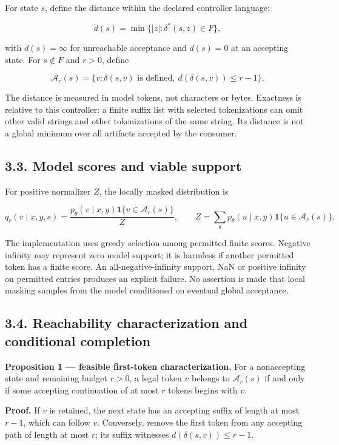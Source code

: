\documentclass[
  12pt,
  a4paper,
]{article}
\begin{document}
For state \(s\), define the distance within the declared controller
language:

\[d(s)=\min\{|z|:\delta^*(s,z)\in F\},\]

with \(d(s)=\infty\) for unreachable acceptance and \(d(s)=0\) at an
accepting state. For \(s\notin F\) and \(r>0\), define

\[\mathcal A_r(s)=\{v:\delta(s,v)\text{ is defined},\ d(\delta(s,v))\le r-1\}.\]

The distance is measured in model tokens, not characters or bytes.
Exactness is relative to this controller: a finite suffix list with
selected tokenizations can omit other valid strings and other
tokenizations of the same string. Its distance is not a global minimum
over all artifacts accepted by the consumer.

\subsection{3.3. Model scores and viable
support}\label{model-scores-and-viable-support}

For positive normalizer \(Z\), the locally masked distribution is

\[q_r(v\mid x,y,s)=\frac{p_\theta(v\mid x,y)\mathbf 1\{v\in\mathcal A_r(s)\}}{Z},\qquad Z=\sum_u p_\theta(u\mid x,y)\mathbf 1\{u\in\mathcal A_r(s)\}.\]

The implementation uses greedy selection among permitted finite scores.
Negative infinity may represent zero model support; it is harmless if
another permitted token has a finite score. An all-negative-infinity
support, NaN or positive infinity on permitted entries produces an
explicit failure. No assertion is made that local masking samples from
the model conditioned on eventual global acceptance.

\subsection{3.4. Reachability characterization and conditional
completion}\label{reachability-characterization-and-conditional-completion}

\textbf{Proposition 1 --- feasible first-token characterization.} For a
nonaccepting state and remaining budget \(r>0\), a legal token \(v\)
belongs to \(\mathcal A_r(s)\) if and only if some accepting
continuation of at most \(r\) tokens begins with \(v\).

\textbf{Proof.} If \(v\) is retained, the next state has an accepting
suffix of length at most \(r-1\), which can follow \(v\). Conversely,
remove the first token from any accepting path of length at most \(r\);
its suffix witnesses \(d(\delta(s,v))\le r-1\).
\end{document}
